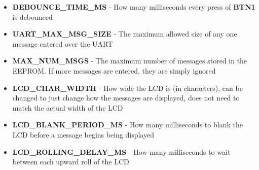 \documentclass[a4paper, 12pt]{article}
\begin{document}
\begin{itemize}
\item \textbf{DEBOUNCE\_TIME\_MS} - How many milliseconds every press of \textbf{BTN1} is debounced
\item \textbf{UART\_MAX\_MSG\_SIZE} - The maximum allowed size of any one message entered over the UART
\item \textbf{MAX\_NUM\_MSGS} - The maximum number of messages stored in the EEPROM. If more messages are entered, they are simply ignored
\item \textbf{LCD\_CHAR\_WIDTH} - How wide the LCD is (in characters), can be changed to just change how the messages are displayed, does not need to match the actual width of the LCD
\item \textbf{LCD\_BLANK\_PERIOD\_MS} - How many milliseconds to blank the LCD before a message begins being displayed
\item \textbf{LCD\_ROLLING\_DELAY\_MS} - How many milliseconds to wait between each upward roll of the LCD
\end{itemize}
\end{document}

